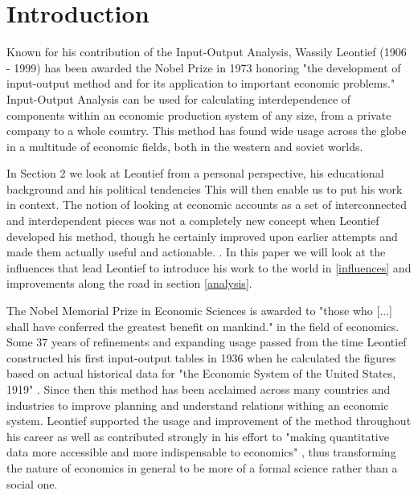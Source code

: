 
\section{Introduction} \label{introduction}


Known for his contribution of the Input-Output Analysis, Wassily Leontief (1906 - 1999) has been awarded the Nobel Prize in 1973 honoring "the development of input-output method and for its application to important economic problems." Input-Output Analysis can be used for calculating interdependence of components within an economic production system of any size, from a private company to a whole country. This method has found wide usage across the globe in a multitude of economic fields, both in the western and soviet worlds.

In Section 2 we look at Leontief from a personal perspective, his educational background and his political tendencies This will then enable us to put his work in context. The notion of looking at economic accounts as a set of interconnected and interdependent pieces was not a completely new concept when Leontief developed his method, though he certainly improved upon earlier attempts and made them actually useful and actionable. \cite[p.~512]{Baumol2009} . In this paper we will look at the influences that lead Leontief to introduce his work to the world in \ref{influences} and improvements along the road in section \ref{analysis}.

The Nobel Memorial Prize in Economic Sciences is awarded to "those who [...] shall have conferred the greatest benefit on mankind." \cite[]{Nobel} in the field of economics. Some 37 years of refinements and expanding usage passed from the time Leontief constructed his first input-output tables in 1936 when he calculated the figures based on actual historical data for "the Economic System of the United States, 1919" \cite[]{kohli2003leontief}. Since then this method has been acclaimed across many countries and industries to improve planning and understand relations withing an economic system. Leontief supported the usage and improvement of the method throughout his career as well as contributed strongly in his effort to "making quantitative data more accessible and more indispensable to economics" \cite[p.75]{dymond2015recent} , thus transforming the nature of economics in general to be more of a formal science rather than a social one.

